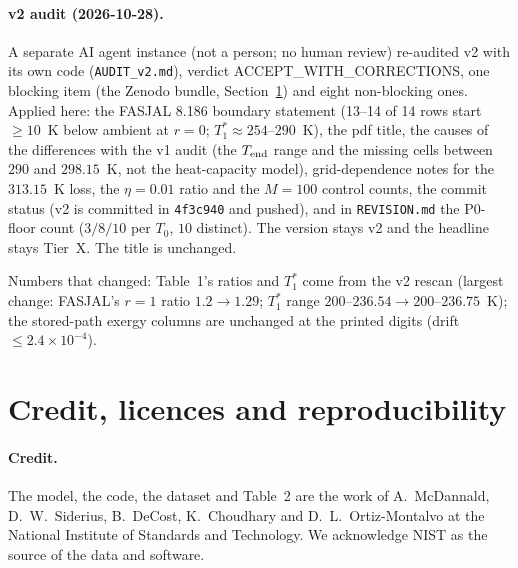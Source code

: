 \documentclass[10pt]{article}
\begin{document}
\paragraph{v2 audit (2026-10-28).} A separate AI agent instance (not a person; no human review) re-audited v2 with its own code (\texttt{AUDIT\_v2.md}), verdict ACCEPT\_WITH\_CORRECTIONS, one blocking item (the Zenodo bundle, Section~\ref{sec:licence}) and eight non-blocking ones. Applied here: the FASJAL 8.186 boundary statement (13--14 of 14 rows start $\ge10$~K below ambient at $r=0$; $T_1^\ast\approx254$--$290$~K), the pdf title, the causes of the differences with the v1 audit (the $T_{\rm end}$ range and the missing cells between $290$ and $298.15$~K, not the heat-capacity model), grid-dependence notes for the $313.15$~K loss, the $\eta=0.01$ ratio and the $M=100$ control counts, the commit status (v2 is committed in \texttt{4f3c940} and pushed), and in \texttt{REVISION.md} the P0-floor count ($3/8/10$ per $T_0$, $10$ distinct). The version stays v2 and the headline stays Tier~X. The title is unchanged.

Numbers that changed: Table~1's ratios and $T_1^\ast$ come from the v2 rescan (largest change: FASJAL's $r=1$ ratio $1.2\to1.29$; $T_1^\ast$ range $200$--$236.54\to200$--$236.75$~K); the stored-path exergy columns are unchanged at the printed digits (drift $\le2.4\times10^{-4}$).

\section{Credit, licences and reproducibility}\label{sec:licence}
\paragraph{Credit.} The model, the code, the dataset and Table~2 are the work of A.~McDannald, D.~W.~Siderius, B.~DeCost, K.~Choudhary and D.~L.~Ortiz-Montalvo at the National Institute of Standards and Technology. We acknowledge NIST as the source of the data and software.
\end{document}
